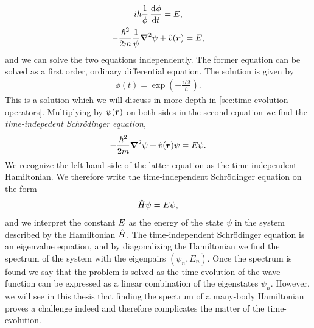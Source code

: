         \begin{gather}
            i\hslash\frac{1}{\phi}\dod{\phi}{t} = \energy, \\
            -\frac{\hslash^2}{2m}\frac{1}{\psi}\vfg{\nabla}^2\psi
            + \hat{v}(\vfg{r}) = E,
        \end{gather}
        and we can solve the two equations independently.
        The former equation can be solved as a first order, ordinary
        differential equation.
        The solution is given by
        \begin{align}
            \phi(t) = \exp(-\frac{iEt}{\hslash}).
        \end{align}
        This is a solution which we will discuss in more depth in
        \autoref{sec:time-evolution-operators}.
        Multiplying by $\psi(\boldsymbol{r})$ on both sides in the second equation we
        find the \emph{time-indepedent Schrödinger equation},
        \begin{align}
            -\frac{\hslash^2}{2m}\boldsymbol{\nabla}^2\psi + \hat{v}(\boldsymbol{r})\psi
            = E\psi.
        \end{align}
        We recognize the left-hand side of the latter equation as the
        time-independent Hamiltonian.
        We therefore write the time-independent Schrödinger equation on the form
        \begin{align}
            \hat{H}\psi = E\psi,
        \end{align}
        and we interpret the constant $E$ as the energy of the state
        $\psi$ in the system described by the Hamiltonian $\hat{H}$.
        The time-independent Schrödinger equation is an eigenvalue equation, and
        by diagonalizing the Hamiltonian we find the spectrum of the system with
        the eigenpairs $(\psi_n, E_n)$.
        Once the spectrum is found we say that the problem is solved as the
        time-evolution of the wave function can be expressed as a linear
        combination of the eigenstates $\psi_n$.
        However, we will see in this thesis that finding the spectrum of a
        many-body Hamiltonian proves a challenge indeed and therefore
        complicates the matter of the time-evolution.

